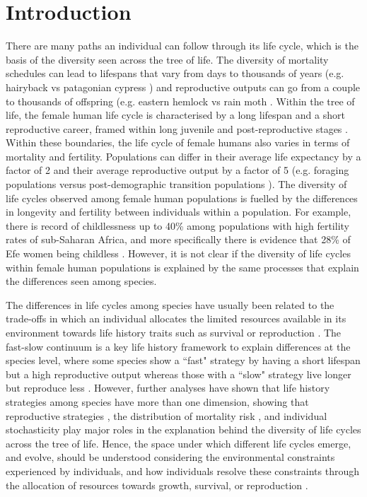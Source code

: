 \documentclass{article}
\begin{document}
\section{Introduction}

There are many paths an individual can follow through its life cycle, which is the basis of the diversity seen across the tree of life. The diversity of mortality schedules can lead to lifespans that vary from days to thousands of years (e.g. hairyback vs patagonian cypress \citep{balsamo1988life,lara19933620}) and reproductive outputs can go from a couple to thousands of offspring (e.g. eastern hemlock vs rain moth \citep{tindale1932revision,van2017lifetime}. Within the tree of life, the female human life cycle is characterised by a long lifespan and a short reproductive career, framed within long juvenile and post-reproductive stages \citep{kaplan2000theory}. Within these boundaries, the life cycle of female humans also varies in terms of mortality and fertility. Populations can differ in their average life expectancy by a factor of 2 and their average reproductive output by a factor of 5 (e.g. foraging populations \citep{migliano2007life} versus post-demographic transition populations \citep{de2017maximum}). The diversity of life cycles observed among female human populations is fuelled by the differences in longevity and fertility between individuals within a population. For example, there is record of childlessness up to 40\% among populations with high fertility rates of sub-Saharan Africa, and more specifically there is evidence that 28\% of Efe women being childless \citep{bailey1995sexuality,belsey1976epidemiology}. However, it is not clear if the diversity of life cycles within female human populations is explained by the same processes that explain the differences seen among species. 

The differences in life cycles among species have usually been related to the trade-offs in which an individual allocates the limited resources available in its environment towards life history traits such as survival or reproduction \citep{stearns2000life}. The fast-slow continuum is a key life history framework to explain differences at the species level, where some species show a ``fast" strategy by having a short lifespan but a high reproductive output whereas those with a ``slow" strategy live longer but reproduce less \citep{stearns1983influence}. However, further analyses have shown that life history strategies among species have more than one dimension, showing that reproductive strategies \citep{salguero2016fast}, the distribution of mortality risk \citep{healy2019animal}, and individual stochasticity \citep{varas2022individual} play major roles in the explanation behind the diversity of life cycles across the tree of life. Hence, the space under which different life cycles emerge, and evolve, should be understood considering the environmental constraints experienced by individuals, and how individuals resolve these constraints through the allocation of resources towards growth, survival, or reproduction \citep{white2022metabolic}.
\end{document}
